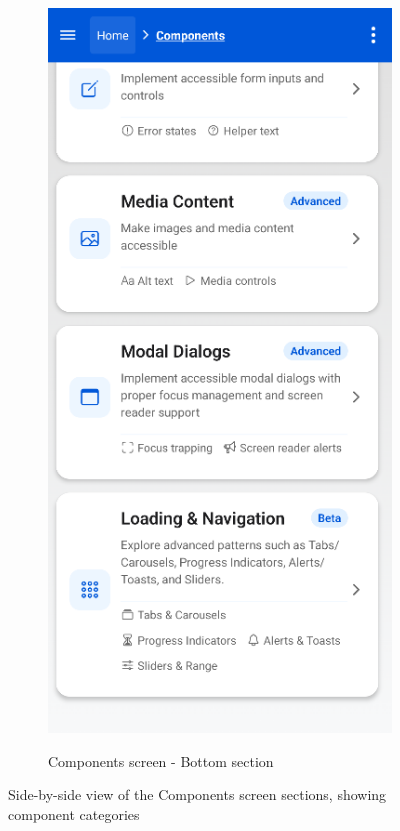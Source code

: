 \begin{figure}[ht]
\begin{subfigure}[b]{0.48\textwidth}
        \centering
        \includegraphics[width=\linewidth, alt={Second part of the Components screen}]{img/components2.png}
        \caption{Components screen - Bottom section}
        \label{fig:components-bottom}
    \end{subfigure}
    \caption{Side-by-side view of the Components screen sections, showing component categories}
    \label{fig:components_screens_sidebyside}
\end{figure}

